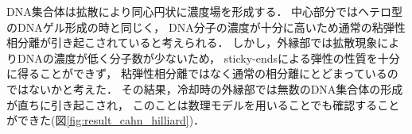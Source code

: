 DNA集合体は拡散により同心円状に濃度場を形成する．
中心部分ではヘテロ型のDNAゲル形成の時と同じく，
DNA分子の濃度が十分に高いため通常の粘弾性相分離が引き起こされていると考えられる．
しかし，外縁部では拡散現象によりDNAの濃度が低く分子数が少ないため，
sticky-endsによる弾性の性質を十分に得ることができず，
粘弾性相分離ではなく通常の相分離にとどまっているのではないかと考えた．
その結果，冷却時の外縁部では無数のDNA集合体の形成が直ちに引き起こされ，
このことは数理モデルを用いることでも確認することができた(図\ref{fig:result_cahn_hilliard})．


